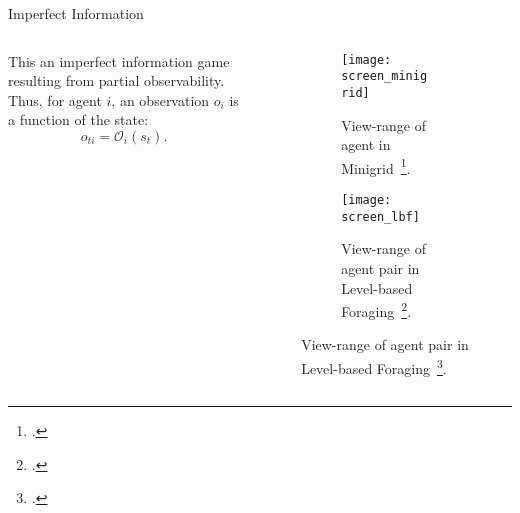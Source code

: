 \begin{frame}{Imperfect Information}
    \begin{columns}
        \begin{column}{0.4\linewidth}
            This an imperfect information game resulting from partial observability.
            \\[1em]
            Thus, for agent \(i\), an observation \(o_i\) is a function of the state:
            \[o_{ti} = \mathcal{O}_{i}(s_{t}) .\]
        \end{column}
        \begin{column}{0.5\linewidth}
            \begin{figure}
                \begin{subfigure}[t]{0.45\textwidth}
                    \texttt{[image: screen\_minigrid]}
                    \caption{View-range of agent in Minigrid~\footcite{chevalier-boisvert2023}.}
                \end{subfigure}
                \hfill
                \begin{subfigure}[t]{0.45\textwidth}
                    \texttt{[image: screen\_lbf]}
                    \caption{View-range of agent pair in Level-based Foraging~\footcite{papoudakis2021}.}
                \end{subfigure}
            \end{figure}
        \end{column}
    \end{columns}
\end{frame}

